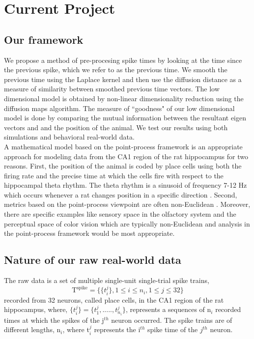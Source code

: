 
\section{Current Project}

\subsection{Our framework}

We propose a method of pre-procesing spike times by looking at the time since the 
previous spike, which we refer to as the previous time. 
We smooth the previous time using the Laplace kernel
and then use the diffusion distance \cite{coifman2006diffusion} as a measure of similarity between smoothed previous time vectors. The low dimensional model is obtained by non-linear dimensionality reduction using the diffusion maps algorithm. The measure of ``goodness" of our low dimensional model is done by comparing the mutual information  \cite{quiroga2009extracting, Dayan2001}  between the resultant eigen vectors and and the position of the animal. We test our results using both simulations and behavioral real-world data.\\

A mathematical model based on the point-process framework is an appropriate approach for modeling  data from the CA1 region of the rat hippocampus for two reasons.
First, the position of the animal is coded by place cells using both the firing rate and the precise time at which the cells fire with respect to the hippocampal theta rhythm.
The theta rhythm is a sinusoid of frequency 7-12 Hz which occurs whenever a rat changes position in  a specific direction \cite{OKeefe1971, Burgess1993}.
Second,  metrics based on the point-process viewpoint are often non-Euclidean \cite{Aronov2004, Victor2005}. Moreover, there are specific examples like sensory space in  the olfactory system and the perceptual space of color vision which are typically non-Euclidean and analysis in the point-process framework would be most appropriate.\\


\subsection{Nature of our raw real-world data}
The raw data is a set of multiple single-unit single-trial spike trains,\\
\[ 
\text{T}^{\text{spike}} = \displaystyle \{ \{ t_{i}^{j} \} , 1 \leq i \leq n_{i}, 1 \leq j \leq 32 \}  
\]
recorded from 32 neurons, called  place cells, in the CA1 region of the rat hippocampus, where,
$\displaystyle  \{t_{i}^{j}\} =  \{t_{1}^{j}, ....., t_{n_{i}}^{j} \} $, represents  a sequences of n$_{i}$ recorded times at which the spikes of the j$^{th}$ neuron occurred.
The spike trains are of different lengths, n$_{i}$, where t$_{i}^{j}$ represents the i$^{th}$ spike time of the $j^{th}$ neuron.

